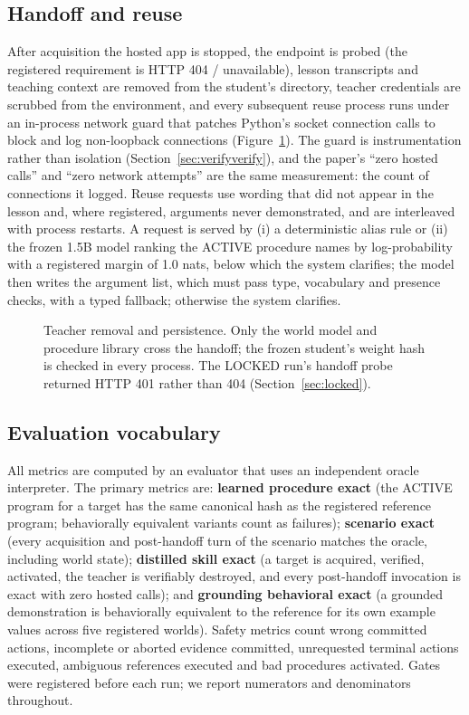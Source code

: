 \documentclass[10pt]{article}
\begin{document}
\subsection{Handoff and reuse}
After acquisition the hosted app is stopped, the endpoint is probed (the registered requirement is HTTP 404 / unavailable), lesson transcripts and teaching context are removed from the student's directory, teacher credentials are scrubbed from the environment, and every subsequent reuse process runs under an in-process network guard that patches Python's socket connection calls to block and log non-loopback connections (Figure~\ref{fig:handoff}). The guard is instrumentation rather than isolation (Section~\ref{sec:verifyverify}), and the paper's ``zero hosted calls'' and ``zero network attempts'' are the same measurement: the count of connections it logged. Reuse requests use wording that did not appear in the lesson and, where registered, arguments never demonstrated, and are interleaved with process restarts. A request is served by (i) a deterministic alias rule or (ii) the frozen 1.5B model ranking the ACTIVE procedure names by log-probability with a registered margin of 1.0 nats, below which the system clarifies; the model then writes the argument list, which must pass type, vocabulary and presence checks, with a typed fallback; otherwise the system clarifies.

\begin{figure}[t]
\centering
\resizebox{\linewidth}{!}{}
\caption{Teacher removal and persistence. Only the world model and procedure library cross the handoff; the frozen student's weight hash is checked in every process. The LOCKED run's handoff probe returned HTTP 401 rather than 404 (Section~\ref{sec:locked}).}
\label{fig:handoff}
\end{figure}

\subsection{Evaluation vocabulary}
All metrics are computed by an evaluator that uses an independent oracle interpreter. The primary metrics are: \textbf{learned procedure exact} (the ACTIVE program for a target has the same canonical hash as the registered reference program; behaviorally equivalent variants count as failures); \textbf{scenario exact} (every acquisition and post-handoff turn of the scenario matches the oracle, including world state); \textbf{distilled skill exact} (a target is acquired, verified, activated, the teacher is verifiably destroyed, and every post-handoff invocation is exact with zero hosted calls); and \textbf{grounding behavioral exact} (a grounded demonstration is behaviorally equivalent to the reference for its own example values across five registered worlds). Safety metrics count wrong committed actions, incomplete or aborted evidence committed, unrequested terminal actions executed, ambiguous references executed and bad procedures activated. Gates were registered before each run; we report numerators and denominators throughout.
\end{document}
